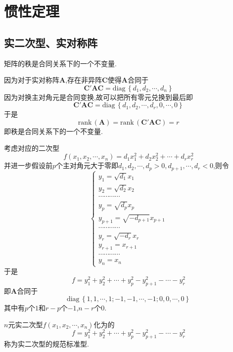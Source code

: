 \section{惯性定理}
\subsection{实二次型、实对称阵}
\begin{formal}
    \begin{theorem}[合同关系不变量]\label{thm:合同关系不变量}
        矩阵的秩是合同关系下的一个不变量.
    \end{theorem}
    \begin{Proof}
        因为对于实对称阵$\bm{A}$,存在非异阵$\bm{C}$使得$\bm{A}$合同于\[
\bm{C}'\bm{AC}=\mathrm{diag}\,\left\{
    d_1,d_2,\cdots,d_n
\right\}
\]因为对换主对角元是合同变换,故可以把所有零元兑换到最后即\[
\bm{C}'\bm{AC}=\mathrm{diag}\,\left\{
    d_1,d_2,\cdots,d_r,0,\cdots,0
\right\}
\]于是\[
\mathrm{rank}\,\left(\bm{A}\right)=\mathrm{rank}\,\left(\bm{C'}\bm{AC}\right)=r
\]即秩是合同关系下的一个不变量.
    \end{Proof}
\end{formal}
考虑对应的二次型\[
f\left(
    x_1,x_2,\cdots,x_n
\right)=d_1x_1^2+d_2x_2^2+\cdots+d_rx_r^2
\]并进一步假设前$p$个主对角元大于零即$d_1,d_2,\cdots,d_p>0,d_{p+1},\cdots,d_r<0$,则令\[
\begin{cases*}
    y_1=\sqrt{d_1}x_1\\
    y_2=\sqrt{d_2}x_2\\
    \cdots\cdots\cdots\cdots\\
    y_p=\sqrt{d_p}x_p\\
    y_{p+1}=\sqrt{-d_{p+1}}x_{p+1}\\
    \cdots\cdots\cdots\cdots\\
    y_r=\sqrt{-d_r}x_r\\
    y_{r+1}=x_{r+1}\\
    \cdots\cdots\cdots\cdots\\
    y_n=x_n
\end{cases*}
\]于是\[
f=y_1^2+y_2^2+\cdots+y_p^2-y_{p+1}^2-\cdots-y_r^2
\]即$\bm{A}$合同于\[
\mathrm{diag}\,\left\{
    1,1,\cdots,1;-1,-1,\cdots,-1;0,0,\cdots,0
\right\}
\]其中有$p$个$1$和$r-p$个$-1$,$n-r$个$0$.
\begin{formal}
    \begin{definition}[规范标准型]\label{def:规范标准型}
        $n$元实二次型$f\left(
            x_1,x_2,\cdots,x_n
        \right)$化为的\[
        f=y_1^2+y_2^2+\cdots+y_p^2-y_{p+1}^2-\cdots-y_r^2
        \]称为实二次型的规范标准型.
    \end{definition}
\end{formal}
